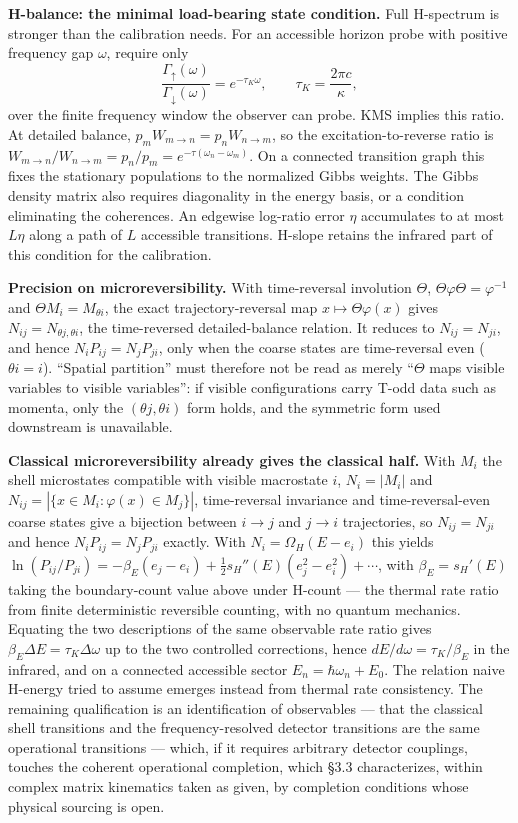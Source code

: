 \documentclass[
]{article}
\begin{document}
\textbf{H-balance: the minimal load-bearing state condition.} Full
H-spectrum is stronger than the calibration needs. For an accessible
horizon probe with positive frequency gap \(\omega\), require only \[
\frac{\Gamma_\uparrow(\omega)}{\Gamma_\downarrow(\omega)}=e^{-\tau_K\omega},\qquad \tau_K=\frac{2\pi c}{\kappa},
\] over the finite frequency window the observer can probe. KMS implies
this ratio. At detailed balance, \(p_mW_{m\to n}=p_nW_{n\to m}\), so the
excitation-to-reverse ratio is
\(W_{m\to n}/W_{n\to m}=p_n/p_m=e^{-\tau(\omega_n-\omega_m)}\). On a
connected transition graph this fixes the stationary populations to the
normalized Gibbs weights. The Gibbs density matrix also requires
diagonality in the energy basis, or a condition eliminating the
coherences. An edgewise log-ratio error \(\eta\) accumulates to at most
\(L\eta\) along a path of \(L\) accessible transitions. H-slope retains
the infrared part of this condition for the calibration.

\textbf{Precision on microreversibility.} With time-reversal involution
\(\Theta\), \(\Theta\varphi\Theta=\varphi^{-1}\) and
\(\Theta M_i=M_{\theta i}\), the exact trajectory-reversal map
\(x\mapsto\Theta\varphi(x)\) gives \(N_{ij}=N_{\theta j,\theta i}\), the
time-reversed detailed-balance relation. It reduces to
\(N_{ij}=N_{ji}\), and hence \(N_iP_{ij}=N_jP_{ji}\), only when the
coarse states are time-reversal even (\(\theta i=i\)). ``Spatial
partition'' must therefore not be read as merely ``\(\Theta\) maps
visible variables to visible variables'': if visible configurations
carry T-odd data such as momenta, only the \((\theta j,\theta i)\) form
holds, and the symmetric form used downstream is unavailable.

\textbf{Classical microreversibility already gives the classical half.}
With \(M_i\) the shell microstates compatible with visible macrostate
\(i\), \(N_i=|M_i|\) and \(N_{ij}=|\{x\in M_i:\varphi(x)\in M_j\}|\),
time-reversal invariance and time-reversal-even coarse states give a
bijection between \(i\to j\) and \(j\to i\) trajectories, so
\(N_{ij}=N_{ji}\) and hence \(N_iP_{ij}=N_jP_{ji}\) exactly. With
\(N_i=\Omega_H(E-e_i)\) this yields
\(\ln(P_{ij}/P_{ji})=-\beta_E(e_j-e_i)+\tfrac12 s_H''(E)(e_j^2-e_i^2)+\cdots\),
with \(\beta_E=s_H'(E)\) taking the boundary-count value above under
H-count --- the thermal rate ratio from finite deterministic reversible
counting, with no quantum mechanics. Equating the two descriptions of
the same observable rate ratio gives
\(\beta_E\Delta E=\tau_K\Delta\omega\) up to the two controlled
corrections, hence \(dE/d\omega=\tau_K/\beta_E\) in the infrared, and on
a connected accessible sector \(E_n=\hbar\omega_n+E_0\). The relation
naive H-energy tried to assume emerges instead from thermal rate
consistency. The remaining qualification is an identification of
observables --- that the classical shell transitions and the
frequency-resolved detector transitions are the same operational
transitions --- which, if it requires arbitrary detector couplings,
touches the coherent operational completion, which §3.3 characterizes,
within complex matrix kinematics taken as given, by completion
conditions whose physical sourcing is open.
\end{document}

